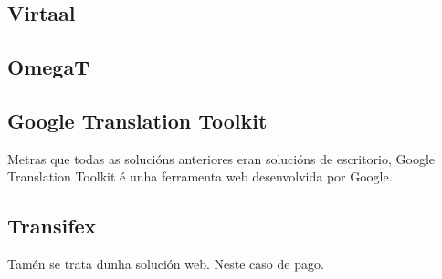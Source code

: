 \subsection{Virtaal}

\subsection{OmegaT}

\subsection{Google Translation Toolkit}
Metras que todas as solucións anteriores eran solucións de escritorio, Google Translation Toolkit é unha ferramenta web desenvolvida por Google.

\subsection{Transifex}
Tamén se trata dunha solución web. Neste caso de pago.


%
%